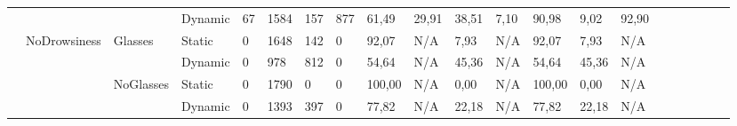 \documentclass[12pt]{article}
\begin{document}
\begin{landscape}
\begin{table}[]
\begin{adjustbox}{width=1.4\textwidth}
\begin{tabular}{lllllllllllllllccllll}
				\multicolumn{1}{|l|}{} & \multicolumn{1}{l|}{} & \multicolumn{1}{l|}{} & \multicolumn{1}{l|}{Dynamic} & \multicolumn{1}{l|}{67} & \multicolumn{1}{l|}{1584} & \multicolumn{1}{l|}{157} & \multicolumn{1}{l|}{877} & \multicolumn{1}{l|}{61,49} & \multicolumn{1}{l|}{29,91} & \multicolumn{1}{l|}{38,51} & \multicolumn{1}{l|}{7,10} & \multicolumn{1}{l|}{90,98} & \multicolumn{1}{l|}{9,02} & \multicolumn{1}{l|}{92,90} & \multicolumn{1}{c|}{} & \multicolumn{1}{c|}{} & \multicolumn{1}{l|}{} & \multicolumn{1}{l|}{} & \multicolumn{1}{l|}{} & \multicolumn{1}{l|}{} \\ \cline{2-15}
				\multicolumn{1}{|l|}{} & \multicolumn{1}{l|}{\multirow{4}{*}{NoDrowsiness}} & \multicolumn{1}{l|}{\multirow{2}{*}{Glasses}} & \multicolumn{1}{l|}{Static} & \multicolumn{1}{l|}{0} & \multicolumn{1}{l|}{1648} & \multicolumn{1}{l|}{142} & \multicolumn{1}{l|}{0} & \multicolumn{1}{l|}{92,07} & \multicolumn{1}{l|}{N/A} & \multicolumn{1}{l|}{7,93} & \multicolumn{1}{l|}{N/A} & \multicolumn{1}{l|}{92,07} & \multicolumn{1}{l|}{7,93} & \multicolumn{1}{l|}{N/A} & \multicolumn{1}{c|}{} & \multicolumn{1}{c|}{} & \multicolumn{1}{l|}{} & \multicolumn{1}{l|}{} & \multicolumn{1}{l|}{} & \multicolumn{1}{l|}{} \\ \cline{4-15}
				\multicolumn{1}{|l|}{} & \multicolumn{1}{l|}{} & \multicolumn{1}{l|}{} & \multicolumn{1}{l|}{Dynamic} & \multicolumn{1}{l|}{0} & \multicolumn{1}{l|}{978} & \multicolumn{1}{l|}{812} & \multicolumn{1}{l|}{0} & \multicolumn{1}{l|}{54,64} & \multicolumn{1}{l|}{N/A} & \multicolumn{1}{l|}{45,36} & \multicolumn{1}{l|}{N/A} & \multicolumn{1}{l|}{54,64} & \multicolumn{1}{l|}{45,36} & \multicolumn{1}{l|}{N/A} & \multicolumn{1}{c|}{} & \multicolumn{1}{c|}{} & \multicolumn{1}{l|}{} & \multicolumn{1}{l|}{} & \multicolumn{1}{l|}{} & \multicolumn{1}{l|}{} \\ \cline{3-15}
				\multicolumn{1}{|l|}{} & \multicolumn{1}{l|}{} & \multicolumn{1}{l|}{\multirow{2}{*}{NoGlasses}} & \multicolumn{1}{l|}{Static}  & \multicolumn{1}{l|}{0} & \multicolumn{1}{l|}{1790} & \multicolumn{1}{l|}{0} & \multicolumn{1}{l|}{0} & \multicolumn{1}{l|}{100,00} & \multicolumn{1}{l|}{N/A} & \multicolumn{1}{l|}{0,00} & \multicolumn{1}{l|}{N/A} & \multicolumn{1}{l|}{100,00} & \multicolumn{1}{l|}{0,00} & \multicolumn{1}{l|}{N/A} & \multicolumn{1}{c|}{} & \multicolumn{1}{c|}{} & \multicolumn{1}{l|}{} & \multicolumn{1}{l|}{} & \multicolumn{1}{l|}{} & \multicolumn{1}{l|}{} \\ \cline{4-15}
				\multicolumn{1}{|l|}{} & \multicolumn{1}{l|}{} & \multicolumn{1}{l|}{} & \multicolumn{1}{l|}{Dynamic} & \multicolumn{1}{l|}{0} & \multicolumn{1}{l|}{1393} & \multicolumn{1}{l|}{397} & \multicolumn{1}{l|}{0} & \multicolumn{1}{l|}{77,82} & \multicolumn{1}{l|}{N/A} & \multicolumn{1}{l|}{22,18} & \multicolumn{1}{l|}{N/A} & \multicolumn{1}{l|}{77,82} & \multicolumn{1}{l|}{22,18} & \multicolumn{1}{l|}{N/A} & \multicolumn{1}{c|}{} & \multicolumn{1}{c|}{} & \multicolumn{1}{l|}{} & \multicolumn{1}{l|}{} & \multicolumn{1}{l|}{} & \multicolumn{1}{l|}{} \\ \hline

\end{tabular}
\end{adjustbox}
\end{table}
\end{landscape}
\end{document}
